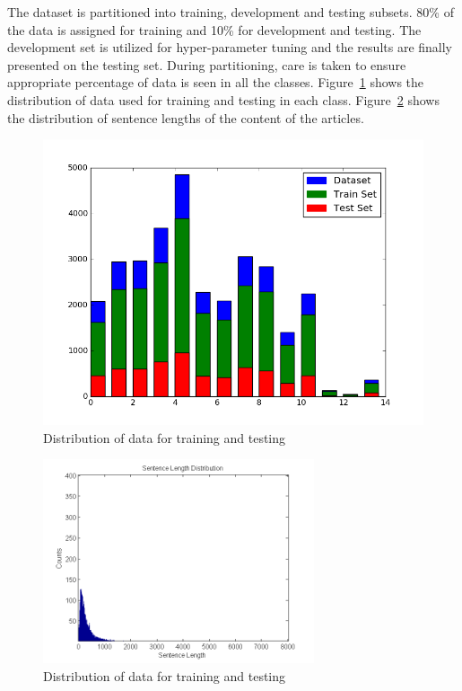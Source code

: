 \documentclass[12pt]{article}
\begin{document}
The dataset is partitioned into training, development and testing subsets. 80\% of the data is assigned for training and 10\% for development and testing. The development set is utilized for hyper-parameter tuning and the results are finally presented on the testing set. During partitioning, care is taken to ensure appropriate percentage of data is seen in all the classes. Figure~\ref{fig:dist} shows the distribution of data used for training and testing in each class. Figure~\ref{fig:sent_dist} shows the distribution of sentence lengths of the content of the articles.

\begin{figure}[h!]
\centering
\includegraphics[width=\textwidth]{figures/test_class_distribution.png}
\caption{Distribution of data for training and testing}\label{fig:dist}
\end{figure}

\begin{figure}[t]
\centering
\includegraphics[width=\textwidth,height=6cm]{figures/sentence_length.png}
\caption{Distribution of data for training and testing}\label{fig:sent_dist}
\end{figure}
\end{document}

